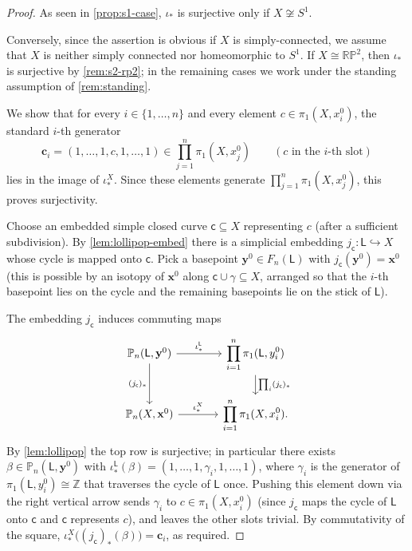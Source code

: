 \documentclass[reqno]{amsart}
\theoremstyle{definition}
\newcommand\bfx{\mathbf{x}}
\newcommand\bfy{\mathbf{y}}
\newcommand{\PB}{\mathbb{P}}
\newcommand{\Z}{\mathbb{Z}}
\newcommand{\RP}{\mathbb{RP}}
\newcommand{\base}{\bfx^0}
\newcommand{\Lollipop}{\mathsf{L}}
\numberwithin{equation}{section}
\begin{document}
\begin{proof}
As seen in \cref{prop:s1-case}, \(\iota_\ast\) is surjective only if \(X\not\cong S^1\).

Conversely, since the assertion is obvious if \(X\) is simply-connected, we assume that \(X\) is neither simply connected nor homeomorphic to \(S^1\). 
If \(X\cong\RP^2\), then \(\iota_\ast\) is surjective by
\cref{rem:s2-rp2}; in the remaining cases we work under the
standing assumption of \cref{rem:standing}.

We show that for every \(i\in\{1,\dots,n\}\)
and every element \(c\in\pi_1(X,x_i^0)\), the standard \(i\)-th
generator
\[
\mathbf{c}_i = (1,\dots,1, c, 1,\dots,1) \in
\prod_{j=1}^n\pi_1(X,x_j^0) \qquad (c\text{ in the \(i\)-th slot})
\]
lies in the image of \(\iota_\ast^X\). Since these elements generate
\(\prod_{j=1}^n\pi_1(X,x_j^0)\), this proves surjectivity.

Choose an embedded simple closed curve \(\mathsf{c}\subseteq X\)
representing \(c\) (after a sufficient subdivision). By
\cref{lem:lollipop-embed} there is a simplicial embedding
\(j_\mathsf{c}\colon \Lollipop\hookrightarrow X\) whose cycle is
mapped onto \(\mathsf{c}\). Pick a basepoint
\(\bfy^0\in F_n(\Lollipop)\) with
\(j_\mathsf{c}(\bfy^0) = \base\) (this is possible by an
isotopy of \(\base\) along \(\mathsf{c}\cup\gamma\subseteq X\),
arranged so that the \(i\)-th basepoint lies on the cycle and the
remaining basepoints lie on the stick of \(\Lollipop\)).

The embedding \(j_\mathsf{c}\) induces commuting maps
\[
\begin{tikzcd}[column sep=large]
\PB_n(\Lollipop,\bfy^0) \arrow[r, "\iota_\ast^{\Lollipop}"]
   \arrow[d, "(j_\mathsf{c})_\ast"']
&\displaystyle \prod_{i=1}^n\pi_1(\Lollipop,y_i^0)
   \arrow[d, "\prod_i (j_\mathsf{c})_\ast"]
\\
\PB_n(X,\base) \arrow[r, "\iota_\ast^X"]
&\displaystyle \prod_{i=1}^n\pi_1(X,x_i^0).
\end{tikzcd}
\]
By \cref{lem:lollipop} the top row is surjective; in
particular there exists
\(\beta\in\PB_n(\Lollipop,\bfy^0)\) with
\(\iota_\ast^{\Lollipop}(\beta) = (1,\dots,1,\gamma_i,1,\dots,1)\),
where \(\gamma_i\) is the generator of
\(\pi_1(\Lollipop,y_i^0)\cong\Z\) that traverses the cycle of
\(\Lollipop\) once. Pushing this element down via the right vertical
arrow sends \(\gamma_i\) to \(c\in\pi_1(X,x_i^0)\) (since
\(j_\mathsf{c}\) maps the cycle of \(\Lollipop\) onto \(\mathsf{c}\)
and \(\mathsf{c}\) represents \(c\)), and leaves the other slots
trivial. By commutativity of the square,
\(\iota_\ast^X\bigl((j_\mathsf{c})_\ast(\beta)\bigr) =\mathbf{c}_i\), as required.
\end{proof}
\end{document}
